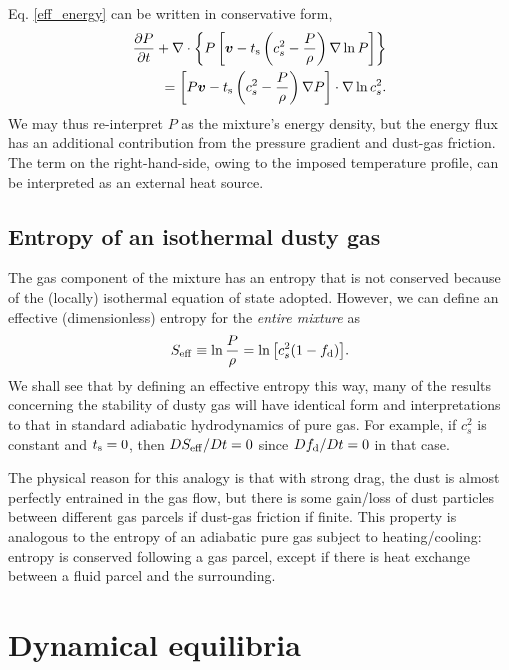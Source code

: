 Eq. \ref{eff_energy} can be written in conservative form,
\begin{align*}
  \frac{\partial P}{ \partial t} + \nabla\cdot\left\{P\left[\bm{v} -
      t_\mathrm{s}\left(c_s^2 - \frac{P}{\rho}\right)\nabla\ln{P}\right]
    \right\}\\
  = \left[P\bm{v} - t_\mathrm{s}\left(c_s^2 - \frac{P}{\rho}\right)\nabla
    P\right]\cdot\nabla\ln{c_s^2}. 
\end{align*} 
We may thus re-interpret $P$ as the mixture's energy density, but the
energy flux has an additional contribution from the pressure
gradient and dust-gas friction. The term on the right-hand-side, owing
to the imposed temperature profile, can be interpreted as an external
heat source.  


\subsection{Entropy of an isothermal dusty gas }

The gas component of the mixture has an entropy that is not conserved 
because of the (locally) isothermal equation of state 
adopted. However, we can define an effective (dimensionless)
entropy for the \emph{entire mixture} as 
\begin{align}
   S_\mathrm{eff} \equiv \ln \frac{P}{\rho} = \ln{\left[c_s^2(1-f_\mathrm{d})\right]}.  
\end{align} 
We shall see that by defining an effective entropy this way, many of the 
results concerning the stability of dusty gas will have identical form
and interpretations to that in standard adiabatic hydrodynamics of 
pure gas. For example, if $c_s^2$ is constant and $t_\mathrm{s}=0$, then
$DS_\mathrm{eff}/ D t = 0$ since $Df_\mathrm{d}/D t=0$ in that case.  

The physical reason for this analogy is that with strong drag, the dust is almost
perfectly entrained in the gas flow, but there is some gain/loss of 
dust particles between different gas parcels if dust-gas
friction if finite. This property is analogous to the entropy of an adiabatic
pure gas subject to heating/cooling: entropy is conserved following
a gas parcel, except if there is heat exchange between a fluid parcel
and the surrounding.  

\section{Dynamical equilibria}\label{eqm}
 
